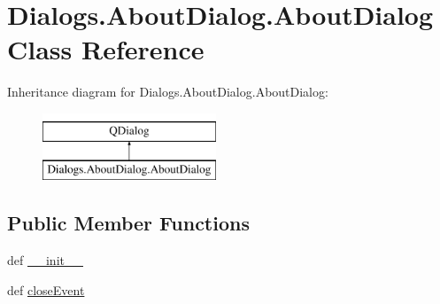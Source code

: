 \hypertarget{classDialogs_1_1AboutDialog_1_1AboutDialog}{\section{Dialogs.\-About\-Dialog.\-About\-Dialog Class Reference}
\label{classDialogs_1_1AboutDialog_1_1AboutDialog}
}
Inheritance diagram for Dialogs.\-About\-Dialog.\-About\-Dialog\-:\begin{figure}[H]
\begin{center}
\leavevmode
\includegraphics[height=2.000000cm]{classDialogs_1_1AboutDialog_1_1AboutDialog}
\end{center}
\end{figure}
\subsection*{Public Member Functions}
\begin{DoxyCompactItemize}
\item 
def \hyperlink{classDialogs_1_1AboutDialog_1_1AboutDialog_a403ad7b77ba4a388a5115edbe2dc1b5e}{\-\_\-\-\_\-init\-\_\-\-\_\-}
\item 
def \hyperlink{classDialogs_1_1AboutDialog_1_1AboutDialog_a8dfef3081ffaf5e468b66648f6bcbfce}{close\-Event}
\end{DoxyCompactItemize}
